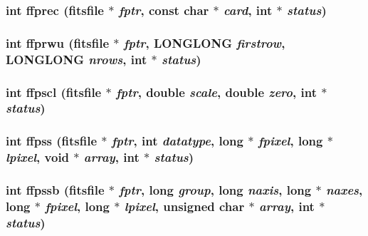 \subsubsection{\setlength{\rightskip}{0pt plus 5cm}int ffprec (\bf{fitsfile} $\ast$ {\em fptr}, const char $\ast$ {\em card}, int $\ast$ {\em status})}\label{test_2roimasker_2fitsio_8h_b8a4ffee9072c15ac03cdb0c28a50730}


\subsubsection{\setlength{\rightskip}{0pt plus 5cm}int ffprwu (\bf{fitsfile} $\ast$ {\em fptr}, \bf{LONGLONG} {\em firstrow}, \bf{LONGLONG} {\em nrows}, int $\ast$ {\em status})}\label{test_2roimasker_2fitsio_8h_a9ad4a1b317ff4337067d66288c9a245}


\subsubsection{\setlength{\rightskip}{0pt plus 5cm}int ffpscl (\bf{fitsfile} $\ast$ {\em fptr}, double {\em scale}, double {\em zero}, int $\ast$ {\em status})}\label{test_2roimasker_2fitsio_8h_55e6ba51c52d4c9ea77e745d5029a42c}


\subsubsection{\setlength{\rightskip}{0pt plus 5cm}int ffpss (\bf{fitsfile} $\ast$ {\em fptr}, int {\em datatype}, long $\ast$ {\em fpixel}, long $\ast$ {\em lpixel}, void $\ast$ {\em array}, int $\ast$ {\em status})}\label{test_2roimasker_2fitsio_8h_42bee00082b5cb488fa8a440392392b1}


\subsubsection{\setlength{\rightskip}{0pt plus 5cm}int ffpssb (\bf{fitsfile} $\ast$ {\em fptr}, long {\em group}, long {\em naxis}, long $\ast$ {\em naxes}, long $\ast$ {\em fpixel}, long $\ast$ {\em lpixel}, unsigned char $\ast$ {\em array}, int $\ast$ {\em status})}\label{test_2roimasker_2fitsio_8h_3c03b253046fc85ef6be13e34ac3d8b2}


